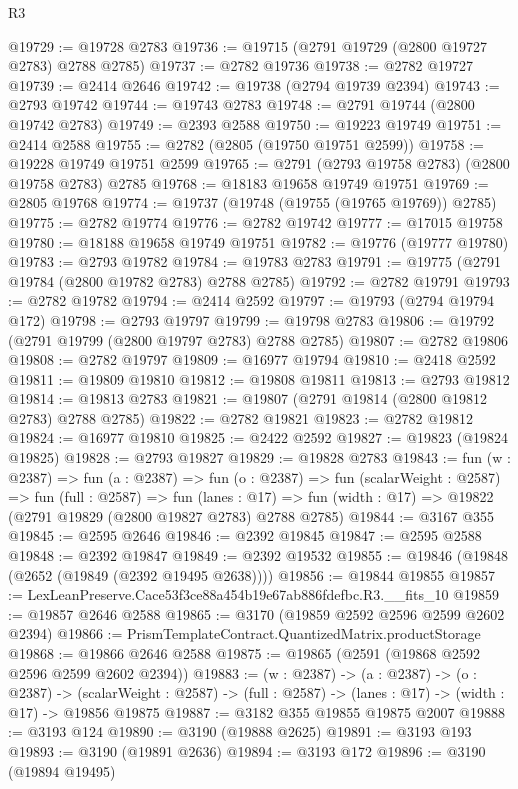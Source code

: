 \begin{lexlean}{R3}
\begin{coremodule}
@19729 := @19728 @2783
@19736 := @19715 (@2791 @19729 (@2800 @19727 @2783) @2788 @2785)
@19737 := @2782 @19736
@19738 := @2782 @19727
@19739 := @2414 @2646
@19742 := @19738 (@2794 @19739 @2394)
@19743 := @2793 @19742
@19744 := @19743 @2783
@19748 := @2791 @19744 (@2800 @19742 @2783)
@19749 := @2393 @2588
@19750 := @19223 @19749
@19751 := @2414 @2588
@19755 := @2782 (@2805 (@19750 @19751 @2599))
@19758 := @19228 @19749 @19751 @2599
@19765 := @2791 (@2793 @19758 @2783) (@2800 @19758 @2783) @2785
@19768 := @18183 @19658 @19749 @19751
@19769 := @2805 @19768
@19774 := @19737 (@19748 (@19755 (@19765 @19769)) @2785)
@19775 := @2782 @19774
@19776 := @2782 @19742
@19777 := @17015 @19758
@19780 := @18188 @19658 @19749 @19751
@19782 := @19776 (@19777 @19780)
@19783 := @2793 @19782
@19784 := @19783 @2783
@19791 := @19775 (@2791 @19784 (@2800 @19782 @2783) @2788 @2785)
@19792 := @2782 @19791
@19793 := @2782 @19782
@19794 := @2414 @2592
@19797 := @19793 (@2794 @19794 @172)
@19798 := @2793 @19797
@19799 := @19798 @2783
@19806 := @19792 (@2791 @19799 (@2800 @19797 @2783) @2788 @2785)
@19807 := @2782 @19806
@19808 := @2782 @19797
@19809 := @16977 @19794
@19810 := @2418 @2592
@19811 := @19809 @19810
@19812 := @19808 @19811
@19813 := @2793 @19812
@19814 := @19813 @2783
@19821 := @19807 (@2791 @19814 (@2800 @19812 @2783) @2788 @2785)
@19822 := @2782 @19821
@19823 := @2782 @19812
@19824 := @16977 @19810
@19825 := @2422 @2592
@19827 := @19823 (@19824 @19825)
@19828 := @2793 @19827
@19829 := @19828 @2783
@19843 := fun (w : @2387) =>
  fun (a : @2387) =>
  fun (o : @2387) =>
  fun (scalarWeight : @2587) =>
  fun (full : @2587) =>
  fun (lanes : @17) => fun (width : @17) => @19822 (@2791 @19829 (@2800 @19827 @2783) @2788 @2785)
@19844 := @3167 @355
@19845 := @2595 @2646
@19846 := @2392 @19845
@19847 := @2595 @2588
@19848 := @2392 @19847
@19849 := @2392 @19532
@19855 := @19846 (@19848 (@2652 (@19849 (@2392 @19495 @2638))))
@19856 := @19844 @19855
@19857 := LexLeanPreserve.Cace53f3ce88a454b19e67ab886fdefbc.R3.__fits_10
@19859 := @19857 @2646 @2588
@19865 := @3170 (@19859 @2592 @2596 @2599 @2602 @2394)
@19866 := PrismTemplateContract.QuantizedMatrix.productStorage
@19868 := @19866 @2646 @2588
@19875 := @19865 (@2591 (@19868 @2592 @2596 @2599 @2602 @2394))
@19883 := (w : @2387) ->
  (a : @2387) ->
  (o : @2387) ->
  (scalarWeight : @2587) -> (full : @2587) -> (lanes : @17) -> (width : @17) -> @19856 @19875
@19887 := @3182 @355 @19855 @19875 @2007
@19888 := @3193 @124
@19890 := @3190 (@19888 @2625)
@19891 := @3193 @193
@19893 := @3190 (@19891 @2636)
@19894 := @3193 @172
@19896 := @3190 (@19894 @19495)

\end{coremodule}
\end{lexlean}

